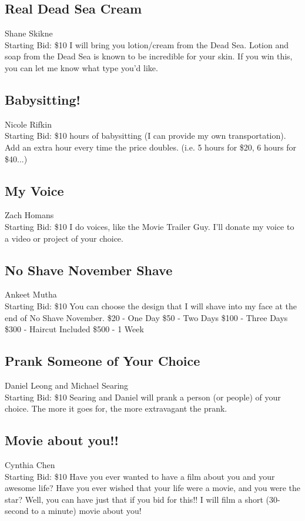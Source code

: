\documentclass[11pt]{article}
\begin{document}
\subsection{Real Dead Sea Cream}
Shane Skikne
\\
Starting Bid: \$10
\newline
I will bring you lotion/cream from the Dead Sea. Lotion and soap from the Dead Sea is known to be incredible for your skin. If you win this, you can let me know what type you'd like.
\subsection{Babysitting!}
Nicole Rifkin
\\
Starting Bid: \$10
 hours of babysitting (I can provide my own transportation). Add an extra hour every time the price doubles. (i.e. 5 hours for \$20, 6 hours for \$40...)
\subsection{My Voice}
Zach Homans
\\
Starting Bid: \$10
\newline
I do voices, like the Movie Trailer Guy. I'll donate my voice to a video or project of your choice.
\subsection{No Shave November Shave}
Ankeet Mutha
\\
Starting Bid: \$10
\newline
You can choose the design that I will shave into my face at the end of No Shave November. 
\$20 - One Day
\$50 - Two Days
\$100 - Three Days
\$300 - Haircut Included
\$500 - 1 Week
\subsection{Prank Someone of Your Choice}
Daniel Leong and Michael Searing
\\
Starting Bid: \$10
\newline
Searing and Daniel will prank a person (or people) of your choice. The more it goes for, the more extravagant the prank.
\subsection{Movie about you!! }
Cynthia Chen
\\
Starting Bid: \$10
\newline
Have you ever wanted to have a film about you and your awesome life? Have you ever wished that your life were a movie, and you were the star? Well, you can have just that if you bid for this!! I will film a short (30-second to a minute) movie about you!
\end{document}
